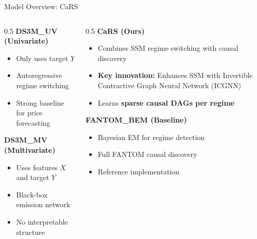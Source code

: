 \documentclass[aspectratio=169]{beamer}
\begin{document}
\begin{frame}{Model Overview: CaRS}
\begin{columns}
\begin{column}{0.5\textwidth}
\textbf{DS3M\_UV (Univariate)}
\begin{itemize}
    \item Only uses target $Y$
    \item Autoregressive regime switching
    \item Strong baseline for price forecasting
\end{itemize}

\vspace{0.3cm}
\textbf{DS3M\_MV (Multivariate)}
\begin{itemize}
    \item Uses features $X$ and target $Y$
    \item Black-box emission network
    \item No interpretable structure
\end{itemize}
\end{column}

\begin{column}{0.5\textwidth}
\textbf{CaRS (Ours)}
\begin{itemize}
    \item Combines SSM regime switching with causal discovery
    \item \textbf{Key innovation:} Enhances SSM with Invertible Contractive Graph Neural Network (ICGNN)%
    \item Learns \textbf{sparse causal DAGs per regime}
\end{itemize}

\textbf{FANTOM\_BEM (Baseline)}
\begin{itemize}
    \item Bayesian EM for regime detection
    \item Full FANTOM causal discovery
    \item Reference implementation
\end{itemize}
\end{column}
\end{columns}

\begin{center}
\end{center}
\end{frame}
\end{document}
